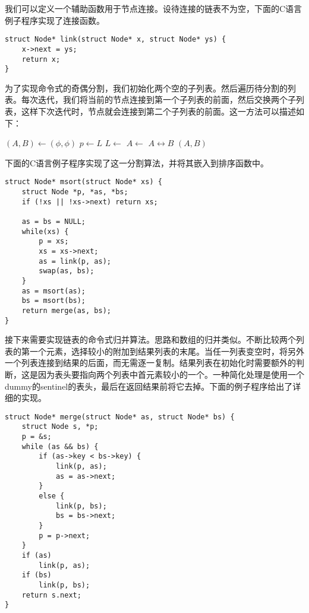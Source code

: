 \documentclass[UTF8]{article}
\begin{document}
我们可以定义一个辅助函数用于节点连接。设待连接的链表不为空，下面的C语言例子程序实现了连接函数。

\lstset{language=C}
\begin{lstlisting}
struct Node* link(struct Node* x, struct Node* ys) {
    x->next = ys;
    return x;
}
\end{lstlisting}

为了实现命令式的奇偶分割，我们初始化两个空的子列表。然后遍历待分割的列表。每次迭代，我们将当前的节点连接到第一个子列表的前面，然后交换两个子列表，这样下次迭代时，节点就会连接到第二个子列表的前面。这一方法可以描述如下：

\begin{algorithmic}[1]
  \State $(A, B) \gets (\phi, \phi)$
    \State $p \gets L$
    \State $L \gets $ 
    \State $A \gets $ 
    \State {} $A \leftrightarrow B$
  \EndWhile
  \State \Return $(A, B)$
\EndFunction
\end{algorithmic}

下面的C语言例子程序实现了这一分割算法，并将其嵌入到排序函数中。

\lstset{language=C}
\begin{lstlisting}
struct Node* msort(struct Node* xs) {
    struct Node *p, *as, *bs;
    if (!xs || !xs->next) return xs;

    as = bs = NULL;
    while(xs) {
        p = xs;
        xs = xs->next;
        as = link(p, as);
        swap(as, bs);
    }
    as = msort(as);
    bs = msort(bs);
    return merge(as, bs);
}
\end{lstlisting}

接下来需要实现链表的命令式归并算法。思路和数组的归并类似。不断比较两个列表的第一个元素，选择较小的附加到结果列表的末尾。当任一列表变空时，将另外一个列表连接到结果的后面，而无需逐一复制。结果列表在初始化时需要额外的判断，这是因为表头要指向两个列表中首元素较小的一个。一种简化处理是使用一个dummy的sentinel的表头，最后在返回结果前将它去掉。下面的例子程序给出了详细的实现。

\lstset{language=C}
\begin{lstlisting}
struct Node* merge(struct Node* as, struct Node* bs) {
    struct Node s, *p;
    p = &s;
    while (as && bs) {
        if (as->key < bs->key) {
            link(p, as);
            as = as->next;
        }
        else {
            link(p, bs);
            bs = bs->next;
        }
        p = p->next;
    }
    if (as)
        link(p, as);
    if (bs)
        link(p, bs);
    return s.next;
}
\end{lstlisting}
\end{document}
